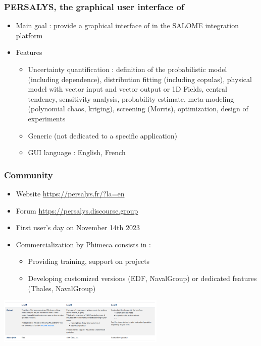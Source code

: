 \documentclass[aspectratio=169]{beamer}
\begin{document}

\begin{frame}
  \frametitle{PERSALYS, the graphical user interface of \ot{}}

  \begin{itemize}
  \item Main goal : provide a graphical interface of
    \ot{} in the SALOME integration platform
  \item Features
    \begin{itemize}
    \item Uncertainty quantification : definition of the
      probabilistic model (including dependence), distribution fitting (including
      copulas), physical model with vector input
      and vector output or 1D Fields,
      central tendency, sensitivity analysis, probability estimate,
      meta-modeling (polynomial chaos, kriging), screening (Morris),
      optimization, design of experiments
    \item Generic (not dedicated to a specific application)
    \item GUI language : English, French
    \end{itemize}
  \end{itemize}

\end{frame}


\begin{frame}
  \frametitle{Community}
\begin{itemize}
\item Website \url{https://persalys.fr/?la=en}
\item Forum \url{https://persalys.discourse.group}
\item First user's day on November 14th 2023
\item Commercialization by Phimeca consists in :
  \begin{itemize}
  \item Providing training, support on projects
  \item Developing customized versions (EDF, NavalGroup) or dedicated features (Thales, NavalGroup)
  \end{itemize}
\end{itemize}
\begin{center}
\includegraphics[width=0.6\textwidth]{figures/site.png}
\end{center}

\end{frame}
\end{document}
